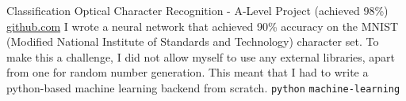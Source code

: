 \documentclass[9pt]{developercv} %
\begin{document}
\begin{entrylist}
    \entry
		{Classification}
		{Optical Character Recognition - A-Level Project (achieved 98\%)}
		{\href{https://github.com/JacobInwald/OCRAlgebra}{github.com}}
		{
			I wrote a neural network that achieved 90\% accuracy on the MNIST (Modified National Institute of Standards and Technology) character set. 
			To make this a challenge, I did not allow myself to use any external libraries, apart from one for random number generation. 
      This meant that I had to write a python-based machine learning backend from scratch.
			\newline
      \texttt{python} \slashsep \texttt{machine-learning}
		}
\end{entrylist}
\end{document}
